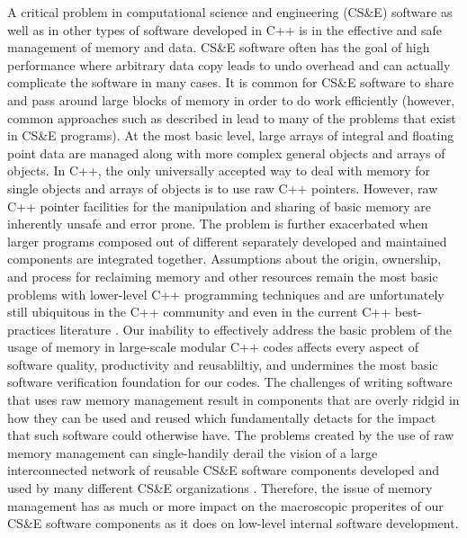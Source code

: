 \documentclass[pdf,ps2pdf,11pt]{SANDreport}
\begin{document}
A critical problem in computational science and engineering (CS\&E)
software as well as in other types of software developed in C++ is in
the effective and safe management of memory and data.  CS\&E software
often has the goal of high performance where arbitrary data copy leads
to undo overhead and can actually complicate the software in many
cases.  It is common for CS\&E software to share and pass around large
blocks of memory in order to do work efficiently (however, common
approaches such as described in
{}\cite{DataSharinginScientificSimulations} lead to many of the
problems that exist in CS\&E programs).  At the most basic level,
large arrays of integral and floating point data are managed along
with more complex general objects and arrays of objects.  In C++, the
only universally accepted way to deal with memory for single objects
and arrays of objects is to use raw C++ pointers.  However, raw C++
pointer facilities for the manipulation and sharing of basic memory
are inherently unsafe and error prone.  The problem is further
exacerbated when larger programs composed out of different separately
developed and maintained components are integrated together.
Assumptions about the origin, ownership, and process for reclaiming
memory and other resources remain the most basic problems with
lower-level C++ programming techniques and are unfortunately still
ubiquitous in the C++ community and even in the current C++
best-practices literature {}\cite{C++CodingStandards05,
EffectiveC++ThirdEdition}.  Our inability to effectively address the
basic problem of the usage of memory in large-scale modular C++ codes
affects every aspect of software quality, productivity and
reusabliltiy, and undermines the most basic software verification
foundation for our codes.  The challenges of writing software that
uses raw memory management result in components that are overly ridgid
in how they can be used and reused which fundamentally detacts for the
impact that such software could otherwise have.  The problems created
by the use of raw memory management can single-handily derail the
vision of a large interconnected network of reusable CS\&E software
components developed and used by many different CS\&E organizations
{}\cite{HPCNeedsAToolsStrategy05}.  Therefore, the issue of memory
management has as much or more impact on the macroscopic properites of
our CS\&E software components as it does on low-level internal
software development.
\end{document}
